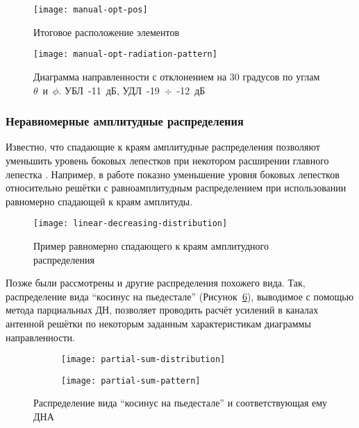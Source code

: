 \begin{figure}[H]
    \centering
    \texttt{[image: manual-opt-pos]}
    \caption{Итоговое расположение элементов}%
    \label{fig:manual-opt-pos}
\end{figure}


\begin{figure}[H]
    \centering
    \texttt{[image: manual-opt-radiation-pattern]}
    \caption{Диаграмма направленности с отклонением на 30 градусов по углам~$\theta$~и~$\phi$. УБЛ~-11~дБ, УДЛ~-19~$\div$~-12~дБ}%
    \label{fig:manual-opt-radiation-pattern}
\end{figure}


\subsubsection{Неравномерные амплитудные распределения}\label{sect:amplitude-distributions}

Известно, что спадающие к краям амплитудные распределения позволяют уменьшить уровень боковых
лепестков при некотором расширении главного лепестка \cite{schelkunoff1943mathematical}.
Например, в работе \cite{schelkunoff1943mathematical} показно уменьшение уровня боковых
лепестков относительно решётки с равноамплитудным распределением при
использовании равномерно спадающей к краям амплитуды.

\begin{figure}[H]
    \centering
    \texttt{[image: linear-decreasing-distribution]}
    \caption{Пример равномерно спадающего к краям амплитудного распределения}%
    \label{fig:linear-decreasing-distribution}
\end{figure}

Позже были рассмотрены и другие распределения похожего вида. Так, распределение вида “косинус на пьедестале”
(Рисунок~\ref{fig:partial-sum-method}), выводимое с помощью метода парциальных ДН, позволяет
проводить расчёт усилений в каналах антенной решётки по некоторым заданным характеристикам
диаграммы направленности. \cite{Chist2012}

\begin{figure}[H]
    \centering
    \begin{subfigure}[b]{0.4\textwidth}
        \centering
        \texttt{[image: partial-sum-distribution]}
        \caption{}%
        \label{fig:partial-sum-distribution}
    \end{subfigure}
    \begin{subfigure}[b]{0.4\textwidth}
        \centering
        \texttt{[image: partial-sum-pattern]}
        \caption{}%
        \label{fig:partial-sum-pattern}
    \end{subfigure}
    \caption{%
        Распределение вида “косинус на пьедестале” и соответствующая ему ДНА
    }%
    \label{fig:partial-sum-method}
\end{figure}

